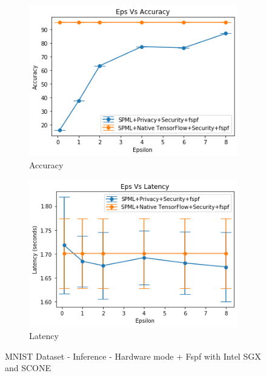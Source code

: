 \begin{figure}
     \begin{subfigure}{0.5\textwidth}
         \includegraphics[width=\textwidth]{images/Inference/MnistFSPFAccuracyInference.png}
         \caption{Accuracy}
         \label{fig:fspfMnistAccuracyInference}
     \end{subfigure}
     \begin{subfigure}{0.5\textwidth}
         \includegraphics[width=\textwidth]{images/Inference/MnistFSPFLatencyInference.png}
         \caption{Latency}
         \label{fig:fspfMnistLatencyInference}
     \end{subfigure}
        \caption{MNIST Dataset - Inference - Hardware mode + Fspf with Intel SGX and SCONE}
\end{figure}
